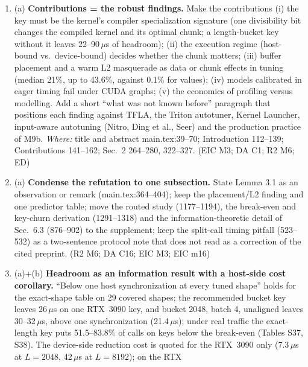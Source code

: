 \documentclass[11pt]{article}
\begin{document}
\begin{enumerate}[label=M1\alph*.]
  \item (a) \textbf{Contributions = the robust findings.} Make the
        contributions (i) the key must be the kernel's compiler
        specialization signature (one divisibility bit changes the compiled
        kernel and its optimal chunk; a length-bucket key without it leaves
        22--90\,$\mu$s of headroom); (ii) the execution regime (host-bound
        vs.\ device-bound) decides whether the chunk matters; (iii) buffer
        placement and a warm L2 masquerade as data or chunk effects in tuning
        (median 21\%, up to 43.6\%, against 0.1\% for values); (iv) models
        calibrated in eager timing fail under CUDA graphs; (v) the economics
        of profiling versus modelling. Add a short ``what was not known
        before'' paragraph that positions each finding against TFLA, the
        Triton autotuner, Kernel Launcher, input-aware autotuning (Nitro, Ding
        et al., Seer) and the production practice of M9b. \emph{Where:} title
        and abstract main.tex:39--70; Introduction 112--139; Contributions
        141--162; Sec.~2 264--280, 322--327. (EIC M3; DA C1; R2 M6; ED)
  \item (a) \textbf{Condense the refutation to one subsection.} State Lemma
        3.1 as an observation or remark (main.tex:364--404); keep the
        placement/L2 finding and one predictor table; move the routed study
        (1177--1194), the break-even and key-churn derivation (1291--1318) and
        the information-theoretic detail of Sec.~6.3 (876--902) to the
        supplement; keep the split-call timing pitfall (523--532) as a
        two-sentence protocol note that does not read as a correction of the
        cited preprint. (R2 M6; DA C16; EIC M3; EIC m16)
  \item (a)+(b) \textbf{Headroom as an information result with a host-side
        cost corollary.} ``Below one host synchronization at every tuned
        shape'' holds for the exact-shape table on 29 covered shapes; the
        recommended bucket key leaves 26\,$\mu$s on one RTX~3090 key, and
        bucket 2048, batch 4, unaligned leaves 30--32\,$\mu$s, above one
        synchronization (21.4\,$\mu$s); under real traffic the exact-length
        key puts 51.5--83.8\% of calls on keys below the break-even (Tables
        S37, S38). The device-side reduction cost is quoted for the RTX~3090
        only (7.3\,$\mu$s at $L=2048$, 42\,$\mu$s at $L=8192$); on the RTX

\end{enumerate}
\end{document}
